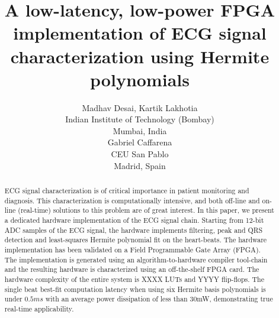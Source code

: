 \documentclass[12pt]{article}
\title{A low-latency, low-power FPGA implementation of ECG signal characterization using Hermite polynomials}
\author{Madhav Desai, Kartik Lakhotia \\
Indian Institute of Technology (Bombay)\\
Mumbai, India \\
Gabriel Caffarena \\
CEU San Pablo\\
Madrid, Spain}
\begin{document}
\maketitle


\begin{abstract}
ECG signal characterization is of critical importance in patient monitoring
and diagnosis.
This characterization is computationally intensive, and
both off-line and on-line (real-time) solutions to this problem are of great interest.
In this paper, we present a dedicated hardware implementation of the ECG signal
chain.  Starting from 12-bit ADC samples of the ECG signal, the hardware implements
filtering, peak and QRS detection and least-squares Hermite polynomial fit on the 
heart-beats.  The hardware implementation has been validated on a Field Programmable 
Gate Array (FPGA).  The implementation is generated using an algorithm-to-hardware 
compiler tool-chain and the resulting hardware is characterized using an off-the-shelf 
FPGA card.  
The hardware complexity of the entire system is XXXX LUTs and YYYY flip-flops.
The single beat best-fit computation latency when using six Hermite basis
polynomials is under $0.5ms$ with an average power dissipation of less than
30mW, demonstrating true real-time applicability.  
\end{abstract}
\end{document}

